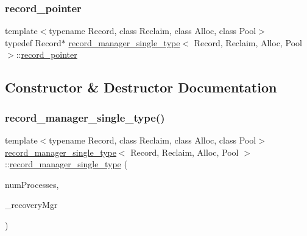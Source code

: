 \mbox{\label{classrecord__manager__single__type_a065f05d1a84e619758122b3da04b1327}} 
\subsubsection{\texorpdfstring{record\+\_\+pointer}{record\_pointer}}
{\footnotesize\ttfamily template$<$typename Record, class Reclaim, class Alloc, class Pool$>$ \\
typedef Record$\ast$ \hyperlink{classrecord__manager__single__type}{record\+\_\+manager\+\_\+single\+\_\+type}$<$ Record, Reclaim, Alloc, Pool $>$\+::\hyperlink{classrecord__manager__single__type_a065f05d1a84e619758122b3da04b1327}{record\+\_\+pointer}\hspace{0.3cm}{\ttfamily [protected]}}



\subsection{Constructor \& Destructor Documentation}
\mbox{\label{classrecord__manager__single__type_af45310278dc150a918d53a6842af8074}} 
\subsubsection{\texorpdfstring{record\+\_\+manager\+\_\+single\+\_\+type()}{record\_manager\_single\_type()}}
{\footnotesize\ttfamily template$<$typename Record, class Reclaim, class Alloc, class Pool$>$ \\
\hyperlink{classrecord__manager__single__type}{record\+\_\+manager\+\_\+single\+\_\+type}$<$ Record, Reclaim, Alloc, Pool $>$\+::\hyperlink{classrecord__manager__single__type}{record\+\_\+manager\+\_\+single\+\_\+type} (\begin{DoxyParamCaption}\item[{const int}]{num\+Processes,  }\item[{\hyperlink{classRecoveryMgr}{Recovery\+Mgr}$<$ void $\ast$$>$ $\ast$const}]{\+\_\+recovery\+Mgr }\end{DoxyParamCaption})\hspace{0.3cm}{\ttfamily [inline]}}

